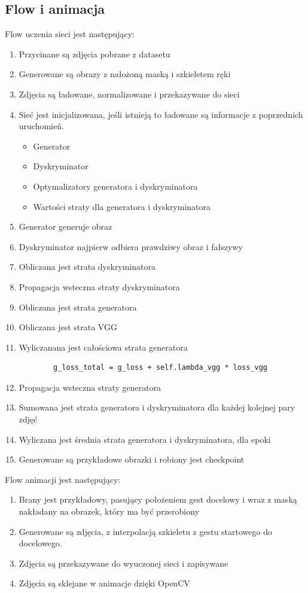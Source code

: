 \documentclass[12pt]{article}
\begin{document}
\begin{sloppypar}
{  \subsection{Flow i animacja} \label{flow}
  {
    Flow uczenia sieci jest następujący:
    \begin{enumerate}
      \item Przycinane są zdjęcia pobrane z datasetu \cite{nuzhdin2024hagridv21mimagesstatic}
      \item Generowane są obrazy z nałożoną maską i szkieletem ręki
      \item Zdjęcia są ładowane, normalizowane i przekazywane do sieci
      \item Sieć jest inicjalizowana, jeśli istnieją to ładowane są informacje z poprzednich uruchomień.
      \begin{itemize}
        \item Generator
        \item Dyskryminator
        \item Optymalizatory generatora i dyskryminatora
        \item Wartości straty dla generatora i dyskryminatora
      \end{itemize}
      \item Generator generuje obraz
      \item Dyskryminator najpierw odbiera prawdziwy obraz i fałszywy
      \item Obliczana jest strata dyskryminatora
      \item Propagacja wsteczna straty dyskryminatora
      \item Obliczana jest strata generatora
      \item Obliczana jest strata VGG
      \item Wyliczanana jest całościowa strata generatora
      \begin{lstlisting}
        g_loss_total = g_loss + self.lambda_vgg * loss_vgg
      \end{lstlisting}
      \item Propagacja wsteczna straty generatora
      \item Sumowana jest strata generatora i dyskryminatora dla każdej kolejnej pary zdjęć
      \item Wyliczana jest średnia strata generatora i dyskryminatora, dla epoki
      \item Generowane są przykładowe obrazki i robiony jest checkpoint
    \end{enumerate}
    Flow animacji jest następujący:
    \begin{enumerate}
      \item Brany jest przykładowy, pasujący położeniem gest docelowy i wraz z maską nakładany na obrazek, który ma być przerobiony
      \item Generowane są zdjęcia, z interpolacją szkieletu z gestu startowego do docelowego.
      \item Zdjęcia są przekazywane do wyuczonej sieci i zapisywane
      \item Zdjęcia są sklejane w animacje dzięki OpenCV
    \end{enumerate}
  }
}


\end{sloppypar}
\end{document}
